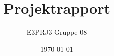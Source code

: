 \documentclass[a4paper,11pt,fleqn,dvipsnames,oneside,openright]{memoir} 	%
\title{Projektrapport}
\author{E3PRJ3 Gruppe 08}
\date{\today{} \currenttime{}}
\begin{document}

\frontmatter

%
\clearpage



\clearpage
\tableofcontents*

\mainmatter










\listoffixmes
\end{document}
